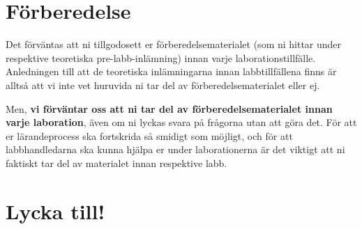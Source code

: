 \documentclass[12pt]{article}
\begin{document}
\section{Förberedelse}
Det förväntas att ni tillgodosett er förberedelsematerialet (som ni hittar under respektive teoretiska pre-labb-inlämning) innan varje laborationstillfälle. Anledningen till att de teoretiska inlämningarna innan labbtillfällena finns är alltså att vi inte vet huruvida ni tar del av förberedelsematerialet eller ej.

Men, \textbf{vi förväntar oss att ni tar del av förberedelsematerialet innan varje laboration}, även om ni lyckas svara på frågorna utan att göra det. För att er lärandeprocess ska fortskrida så smidigt som möjligt, och för att labbhandledarna ska kunna hjälpa er under laborationerna är det viktigt att ni faktiskt tar del av materialet innan respektive labb.

\section{Lycka till!}
\end{document}
